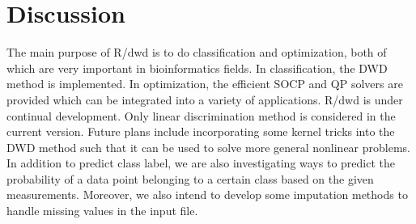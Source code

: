 \documentclass{bioinfo}
\begin{document}
\section{Discussion}
The main purpose of R/dwd is to do classification and optimization, both of
which are very important in bioinformatics fields. In classification, the DWD
method is implemented. In optimization, the efficient SOCP and QP solvers are provided
which can be integrated into a variety of applications. R/dwd is under continual
development. Only linear discrimination method is considered in the
current version. Future plans include incorporating some kernel tricks into the
DWD method such that it can be used to solve more general nonlinear problems. In
addition to predict class label, we are also investigating ways to predict the
probability of a data point belonging to a certain class based on the given
measurements. Moreover, we also intend to develop some imputation methods to
handle missing values in the input file.
\end{document}
